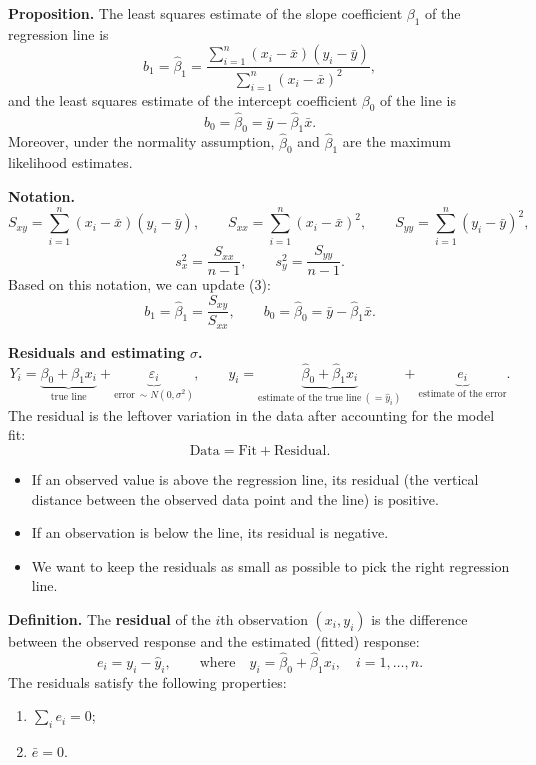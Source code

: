 \textbf{Proposition.} The least squares estimate of the slope coefficient $\beta_1$ of the regression line is
\[
b_1=\hat\beta_1=\frac{\sum_{i=1}^n(x_i-\bar{x})(y_i-\bar{y})}{\sum_{i=1}^n(x_i-\bar{x})^2}, \tag{3}
\]
and the least squares estimate of the intercept coefficient $\beta_0$ of the line is
\[
b_0=\hat\beta_0=\bar{y}-\hat\beta_1\bar{x}.
\]
Moreover, under the normality assumption, $\hat\beta_0$ and $\hat\beta_1$ are the maximum likelihood estimates.

\textbf{Notation.}
\[
S_{xy}=\sum_{i=1}^n(x_i-\bar{x})(y_i-\bar{y}),\qquad
S_{xx}=\sum_{i=1}^n(x_i-\bar{x})^2,\qquad
S_{yy}=\sum_{i=1}^n(y_i-\bar{y})^2,
\]
\[
s_x^2=\frac{S_{xx}}{n-1},\qquad s_y^2=\frac{S_{yy}}{n-1}.
\]
Based on this notation, we can update (3):
\[
b_1=\hat\beta_1=\frac{S_{xy}}{S_{xx}},\qquad b_0=\hat\beta_0=\bar{y}-\hat\beta_1\bar{x}.
\]

\textbf{Residuals and estimating $\sigma$.}
\[
Y_i=\underbrace{\beta_0+\beta_1x_i}_{\text{true line}}+\underbrace{\varepsilon_i}_{\text{error}\ \sim N(0,\sigma^2)},
\qquad
y_i=\underbrace{\hat\beta_0+\hat\beta_1x_i}_{\text{estimate of the true line}\ (=\hat{y}_i)}+\underbrace{e_i}_{\text{estimate of the error}}.
\]
The residual is the leftover variation in the data after accounting for the model fit:
\[
\text{Data} = \text{Fit} + \text{Residual}.
\]
\begin{itemize}
  \item If an observed value is above the regression line, its residual (the vertical distance between the observed data point and the line) is positive.
  \item If an observation is below the line, its residual is negative.
  \item We want to keep the residuals as small as possible to pick the right regression line.
\end{itemize}

\textbf{Definition.} The \textbf{residual} of the $i$th observation $(x_i,y_i)$ is the difference between the observed response and the estimated (fitted) response:
\[
e_i=y_i-\hat{y}_i,\qquad\text{where}\quad \hat{y}_i=\hat\beta_0+\hat\beta_1x_i,\quad i=1,\dots,n.
\]
The residuals satisfy the following properties:
\begin{enumerate}
  \item $\sum_i e_i=0$;
  \item $\bar{e}=0$.
\end{enumerate}

